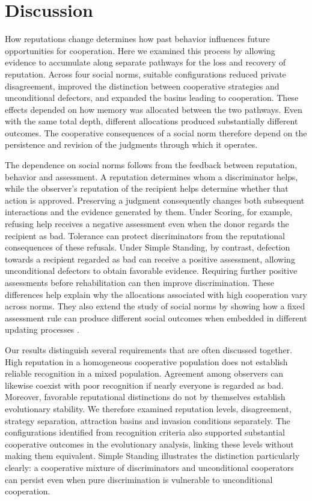 \documentclass[fleqn,10pt]{wlscirep}
\begin{document}
\section*{Discussion}
How reputations change determines how past behavior influences
future opportunities for cooperation. Here we examined this process
by allowing evidence to accumulate along separate pathways for the
loss and recovery of reputation. Across four social norms, suitable
configurations reduced private disagreement, improved the distinction
between cooperative strategies and unconditional defectors, and
expanded the basins leading to cooperation. These effects depended
on how memory was allocated between the two pathways. Even with the
same total depth, different allocations produced substantially
different outcomes. The cooperative consequences of a social norm
therefore depend on the persistence and revision of the judgments
through which it operates.

The dependence on social norms follows from the feedback between
reputation, behavior and assessment. A reputation determines whom
a discriminator helps, while the observer's reputation of the
recipient helps determine whether that action is approved. Preserving
a judgment consequently changes both subsequent interactions and
the evidence generated by them. Under Scoring, for example, refusing
help receives a negative assessment even when the donor regards
the recipient as bad. Tolerance can protect discriminators from
the reputational consequences of these refusals. Under Simple
Standing, by contrast, defection towards a recipient regarded as
bad can receive a positive assessment, allowing unconditional
defectors to obtain favorable evidence. Requiring further positive
assessments before rehabilitation can then improve discrimination.
These differences help explain why the allocations associated with
high cooperation vary across norms. They also extend the study of
social norms by showing how a fixed assessment rule can produce
different social outcomes when embedded in different updating
processes \cite{ohtsuki2006,kessinger2023}.

Our results distinguish several requirements that are often discussed
together. High reputation in a homogeneous cooperative population
does not establish reliable recognition in a mixed population.
Agreement among observers can likewise coexist with poor recognition
if nearly everyone is regarded as bad. Moreover, favorable
reputational distinctions do not by themselves establish evolutionary
stability. We therefore examined reputation levels, disagreement,
strategy separation, attraction basins and invasion conditions
separately. The configurations identified from recognition criteria
also supported substantial cooperative outcomes in the evolutionary
analysis, linking these levels without making them equivalent.
Simple Standing illustrates the distinction particularly clearly:
a cooperative mixture of discriminators and unconditional cooperators
can persist even when pure discrimination is vulnerable to
unconditional cooperation.
\end{document}
